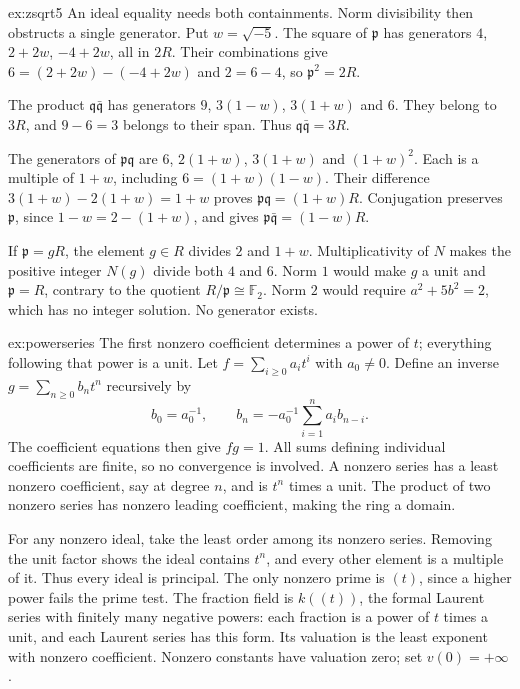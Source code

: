\begin{solution}{ex:zsqrt5}
\idea An ideal equality needs both containments. Norm divisibility then obstructs a single generator.
\writeup Put $w=\sqrt{-5}$. The square of $\mathfrak p$ has generators $4$, $2+2w$, $-4+2w$, all in $2R$. Their combinations give $6=(2+2w)-(-4+2w)$ and $2=6-4$, so $\mathfrak p^2=2R$.

The product $\mathfrak q\bar{\mathfrak q}$ has generators $9$, $3(1-w)$, $3(1+w)$ and $6$. They belong to $3R$, and $9-6=3$ belongs to their span. Thus $\mathfrak q\bar{\mathfrak q}=3R$.

The generators of $\mathfrak p\mathfrak q$ are $6$, $2(1+w)$, $3(1+w)$ and $(1+w)^2$. Each is a multiple of $1+w$, including $6=(1+w)(1-w)$. Their difference $3(1+w)-2(1+w)=1+w$ proves $\mathfrak p\mathfrak q=(1+w)R$. Conjugation preserves $\mathfrak p$, since $1-w=2-(1+w)$, and gives $\mathfrak p\bar{\mathfrak q}=(1-w)R$.

If $\mathfrak p=gR$, the element $g\in R$ divides $2$ and $1+w$. Multiplicativity of $N$ makes the positive integer $N(g)$ divide both $4$ and $6$. Norm $1$ would make $g$ a unit and $\mathfrak p=R$, contrary to the quotient $R/\mathfrak p\cong\mathbb F_2$. Norm $2$ would require $a^2+5b^2=2$, which has no integer solution. No generator exists.
\end{solution}

\begin{solution}{ex:powerseries}
\idea The first nonzero coefficient determines a power of $t$; everything following that power is a unit.
\writeup Let $f=\sum_{i\ge0}a_it^i$ with $a_0\ne0$. Define an inverse $g=\sum_{n\ge0}b_nt^n$ recursively by
\[
 b_0=a_0^{-1},\qquad b_n=-a_0^{-1}\sum_{i=1}^na_i b_{n-i}.
\]
The coefficient equations then give $fg=1$. All sums defining individual coefficients are finite, so no convergence is involved. A nonzero series has a least nonzero coefficient, say at degree $n$, and is $t^n$ times a unit. The product of two nonzero series has nonzero leading coefficient, making the ring a domain.

For any nonzero ideal, take the least order among its nonzero series. Removing the unit factor shows the ideal contains $t^n$, and every other element is a multiple of it. Thus every ideal is principal. The only nonzero prime is $(t)$, since a higher power fails the prime test. The fraction field is $k((t))$, the formal Laurent series with finitely many negative powers: each fraction is a power of $t$ times a unit, and each Laurent series has this form. Its valuation is the least exponent with nonzero coefficient. Nonzero constants have valuation zero; set $v(0)=+\infty$.
\end{solution}

